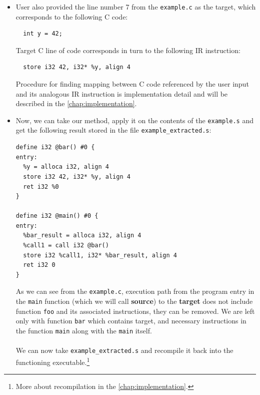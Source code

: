 \documentclass[12pt, twoside]{fithesis2}
\renewcommand{\_}{\leavevmode \kern0.07em\vbox{\hrule width0.4em}}
\newcommand{\squarebullet}{\textcolor{black}{\raisebox{0.15em}{\rule{4pt}{4pt}}}}
\newenvironment{myItemize}{
  \begin{itemize}[
    leftmargin=2em,
    rightmargin=1em,
    itemsep=\parskip,
    parsep=0em,
    topsep=0em,
    partopsep=0em
]
  \renewcommand{\labelitemi}{\squarebullet}
  \renewcommand{\labelitemii}{\textbullet}
}{
  \end{itemize}
}
\begin{document}
\begin{myItemize}
\item User also provided the line number 7 from the \texttt{example.c}
as the target, which corresponds to the following C code:
\smallskip

\begin{verbatim}
  int y = 42;
\end{verbatim}

Target C line of code corresponds in turn to the following IR instruction:

\begin{verbatim}
  store i32 42, i32* %y, align 4
\end{verbatim}

Procedure for finding mapping between C code referenced by the user input and
its analogous IR instruction is implementation detail and will be described
in the \autoref{chap:implementation}.
\end{myItemize}

\begin{myItemize}
\item Now, we can take our method, apply it on the contents of the
\texttt{example.s} and get the following result stored in the file
\texttt{example_extracted.s}:

\begin{verbatim}
define i32 @bar() #0 {
entry:
  %y = alloca i32, align 4
  store i32 42, i32* %y, align 4
  ret i32 %0
}

define i32 @main() #0 {
entry:
  %bar_result = alloca i32, align 4
  %call1 = call i32 @bar()
  store i32 %call1, i32* %bar_result, align 4
  ret i32 0
}
\end{verbatim}

As we can see from the \texttt{example.c}, execution path from
the program entry in the \texttt{main} function (which we will
call \textbf{source}) to the \textbf{target} does not include function
\texttt{foo} and its associated instructions, they can be removed.
We are left only with function \texttt{bar} which contains target,
and necessary instructions in the function \texttt{main} along with
the \texttt{main} itself.
\\
\\
We can now take \texttt{example_extracted.s} and recompile it back
into the functioning executable.\footnote{
More about recompilation in the \autoref{chap:implementation}.
}
\end{myItemize}
\end{document}
